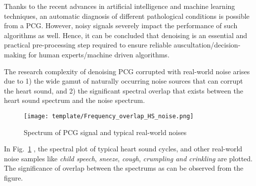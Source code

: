 \documentclass[sigconf,screen]{acmart}
\begin{document}
Thanks to the recent advances in artificial intelligence and machine learning techniques, an automatic diagnosis of different pathological conditions is possible from a PCG.  However, noisy signals severely impact the performance of such algorithms as well. Hence, it can be concluded that denoising is an essential and practical pre-processing step required to ensure reliable auscultation/decision-making for human experts/machine driven algorithms. 

The research complexity of denoising PCG corrupted with real-world noise arises due to 1) the wide gamut of naturally occurring noise sources that can corrupt the heart sound, and 2) the significant spectral overlap that exists between the heart sound spectrum and the noise spectrum. 

\begin{figure}[]
	\centering
	\texttt{[image: template/Frequency\_overlap\_HS\_noise.png]}
	\caption{Spectrum of PCG signal and typical real-world noises}
	\label{Frequency_overlap_HS_noise}
\end{figure}
In Fig.~\ref{Frequency_overlap_HS_noise} , the spectral plot of typical heart sound cycles, and other real-world noise samples like \textit{child speech}, \textit{sneeze}, \textit{cough}, \textit{crumpling and crinkling} are plotted. The significance of overlap between the spectrums as can be observed from the figure. 



\end{document}
